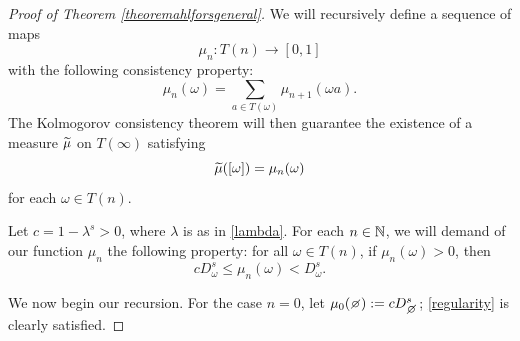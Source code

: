 \begin{proof}[Proof of Theorem \ref{theoremahlforsgeneral}]
We will recursively define a sequence of maps 
\[
\mu_n:T(n)\to[0,1]
\]
with the following consistency property:
\begin{equation}
\label{consistency}
\mu_n(\omega) = \sum_{a\in T(\omega)}\mu_{n + 1}(\omega a).
\end{equation}
The Kolmogorov consistency theorem will then guarantee the existence of a measure $\widetilde\mu$ on $T(\infty)$ satisfying 
\begin{equation}
\label{Kolmogorov}
\widetilde\mu([\omega]) = \mu_n(\omega)
\end{equation}
for each $\omega\in T(n)$.

Let $c = 1 - \lambda^s > 0$, where $\lambda$ is as in \eqref{lambda}. For each $n\in\N$, we will demand of our function $\mu_n$ the following property: for all $\omega\in T(n)$, if $\mu_n(\omega) > 0$, then 
\begin{equation}
\label{regularity}
cD_\omega^s \leq \mu_n(\omega) < D_\omega^s.
\end{equation}

We now begin our recursion. For the case $n = 0$, let $\mu_0(\emptyset):= c D_\smallemptyset^s$; \eqref{regularity} is clearly satisfied.


\end{proof}
